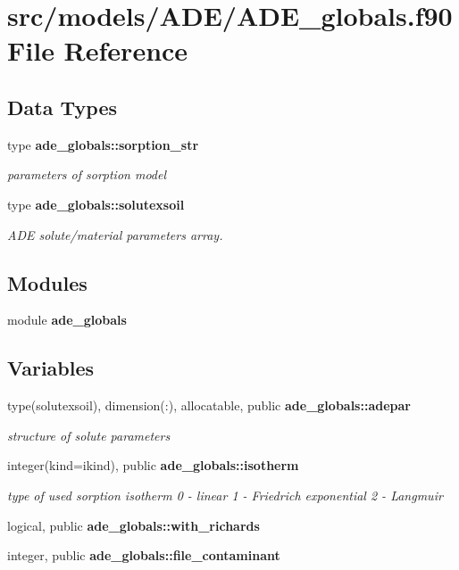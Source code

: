 \section{src/models/\+A\+D\+E/\+A\+D\+E\+\_\+globals.f90 File Reference}
\label{_a_d_e__globals_8f90}
\subsection*{Data Types}
\begin{DoxyCompactItemize}
\item 
type {\bf ade\+\_\+globals\+::sorption\+\_\+str}
\begin{DoxyCompactList}\small\item\em parameters of sorption model \end{DoxyCompactList}\item 
type {\bf ade\+\_\+globals\+::solutexsoil}
\begin{DoxyCompactList}\small\item\em A\+DE solute/material parameters array. \end{DoxyCompactList}\end{DoxyCompactItemize}
\subsection*{Modules}
\begin{DoxyCompactItemize}
\item 
module {\bf ade\+\_\+globals}
\end{DoxyCompactItemize}
\subsection*{Variables}
\begin{DoxyCompactItemize}
\item 
type(solutexsoil), dimension(\+:), allocatable, public {\bf ade\+\_\+globals\+::adepar}
\begin{DoxyCompactList}\small\item\em structure of solute parameters \end{DoxyCompactList}\item 
integer(kind=ikind), public {\bf ade\+\_\+globals\+::isotherm}
\begin{DoxyCompactList}\small\item\em type of used sorption isotherm 0 -\/ linear 1 -\/ Friedrich exponential 2 -\/ Langmuir \end{DoxyCompactList}\item 
logical, public {\bf ade\+\_\+globals\+::with\+\_\+richards}
\item 
integer, public {\bf ade\+\_\+globals\+::file\+\_\+contaminant}
\end{DoxyCompactItemize}
